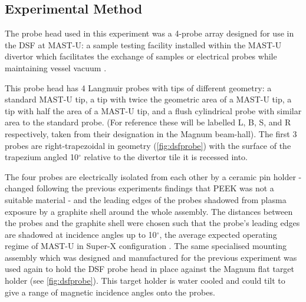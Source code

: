 \documentclass[a4paper, 12pt]{article} %
\begin{document}
\subsection{Experimental Method}
	The probe head used in this experiment was a 4-probe array designed for use in the DSF at MAST-U: a sample testing facility installed within the MAST-U divertor which facilitates the exchange of samples or electrical probes while maintaining vessel vacuum \cite{Elmore2012}.
	 
	This probe head has 4 Langmuir probes with tips of different geometry: a standard MAST-U tip, a tip with twice the geometric area of a MAST-U tip, a tip with half the area of a MAST-U tip, and a flush cylindrical probe with similar area to the standard probe. 
	(For reference these will be labelled L, B, S, and R respectively, taken from their designation in the Magnum beam-hall). 
	The first 3 probes are right-trapezoidal in geometry (\cref{fig:dsfprobe}) with the surface of the trapezium angled 10$^{\circ}$ relative to the divertor tile it is recessed into.

	The four probes are electrically isolated from each other by a ceramic pin holder - changed following the previous experiments findings that PEEK was not a suitable material - and the leading edges of the probes shadowed from plasma exposure by a graphite shell around the whole assembly. 
	The distances between the probes and the graphite shell were chosen such that the probe's leading edges are shadowed at incidence angles up to 10$^{\circ}$, the average expected operating regime of MAST-U in Super-X configuration \cite{Harrison}.	
	The same specialised mounting assembly which was designed and manufactured for the previous experiment was used again to hold the DSF probe head in place against the Magnum flat target holder (see \cref{fig:dsfprobe}).
	This target holder is water cooled and could tilt to give a range of magnetic incidence angles onto the probes.
	
\end{document}
